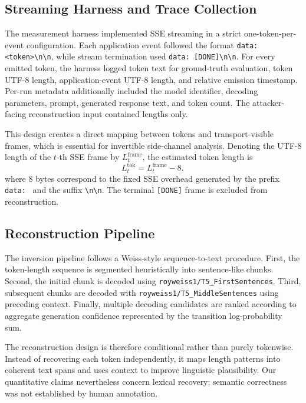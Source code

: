 \documentclass[journal,article,submit,pdftex,moreauthors]{Definitions/mdpi}
\begin{document}
\subsection{Streaming Harness and Trace Collection}
The measurement harness implemented SSE streaming in a strict one-token-per-event configuration. Each application event followed the format \texttt{data: \textless token\textgreater\textbackslash n\textbackslash n}, while stream termination used \texttt{data: [DONE]\textbackslash n\textbackslash n}. For every emitted token, the harness logged token text for ground-truth evaluation, token UTF-8 length, application-event UTF-8 length, and relative emission timestamp. Per-run metadata additionally included the model identifier, decoding parameters, prompt, generated response text, and token count. The attacker-facing reconstruction input contained lengths only.

This design creates a direct mapping between tokens and transport-visible frames, which is essential for invertible side-channel analysis. Denoting the UTF-8 length of the $t$-th SSE frame by $L^{\mathrm{frame}}_t$, the estimated token length is
\begin{equation}
L^{\mathrm{tok}}_t = L^{\mathrm{frame}}_t - 8,
\end{equation}
where 8 bytes correspond to the fixed SSE overhead generated by the prefix \texttt{data: } and the suffix \texttt{\textbackslash n\textbackslash n}. The terminal \texttt{[DONE]} frame is excluded from reconstruction.

\subsection{Reconstruction Pipeline}
The inversion pipeline follows a Weiss-style sequence-to-text procedure. First, the token-length sequence is segmented heuristically into sentence-like chunks. Second, the initial chunk is decoded using \texttt{royweiss1/T5\_FirstSentences}. Third, subsequent chunks are decoded with \texttt{royweiss1/T5\_MiddleSentences} using preceding context. Finally, multiple decoding candidates are ranked according to aggregate generation confidence represented by the transition log-probability sum.

The reconstruction design is therefore conditional rather than purely tokenwise. Instead of recovering each token independently, it maps length patterns into coherent text spans and uses context to improve linguistic plausibility. Our quantitative claims nevertheless concern lexical recovery; semantic correctness was not established by human annotation.
\end{document}
